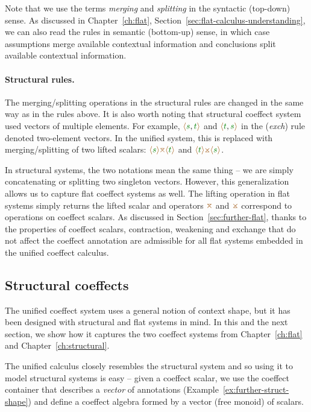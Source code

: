 Note that we use the terms \emph{merging} and \emph{splitting} in the syntactic (top-down) sense. As
discussed in Chapter~\ref{ch:flat}, Section~\ref{sec:flat-calculus-understanding}, we can also read
the rules in semantic (bottom-up) sense, in which case assumptions merge available contextual
information and conclusions split available contextual information.

\paragraph{Structural rules.}
The merging/splitting operations in the structural rules are changed in the same way as in the
rules above. It is also worth noting that structural coeffect system used vectors of multiple
elements. For example, $\alift{\cclrd{s},\cclrd{t}}$ and $\alift{\cclrd{t},\cclrd{s}}$ in the (\emph{exch})
rule denoted two-element vectors. In the unified system, this is replaced with merging/splitting
of two lifted scalars: $\alift{\cclrd{s}} \azip \alift{\cclrd{t}}$ and $\alift{\cclrd{t}} \apar \alift{\cclrd{s}}$.

In structural systems, the two notations mean the same thing -- we are simply concatenating or splitting two
singleton vectors. However, this generalization allows us to capture flat coeffect systems as well.
The lifting operation in flat systems simply returns the lifted scalar and operators $\azip$ and
$\apar$ correspond to operations on coeffect scalars. As discussed in Section~\ref{sec:further-flat},
thanks to the properties of coeffect scalars, contraction, weakening and exchange that do not
affect the coeffect annotation are admissible for all flat systems embedded in the unified
coeffect calculus.


\subsection{Structural coeffects}
\label{sec:further-structural}

The unified coeffect system uses a general notion of context shape, but it has been designed with
structural and flat systems in mind. In this and the next section, we show how it captures
the two coeffect systems from Chapter~\ref{ch:flat} and Chapter~\ref{ch:structural}.

The unified calculus closely resembles the structural system and so using it to model structural
systems is easy -- given a coeffect scalar, we use the coeffect container that describes a \emph{vector}
of annotations (Example~\ref{ex:further-struct-shape}) and define a coeffect algebra formed by
a vector (free monoid) of scalars.

